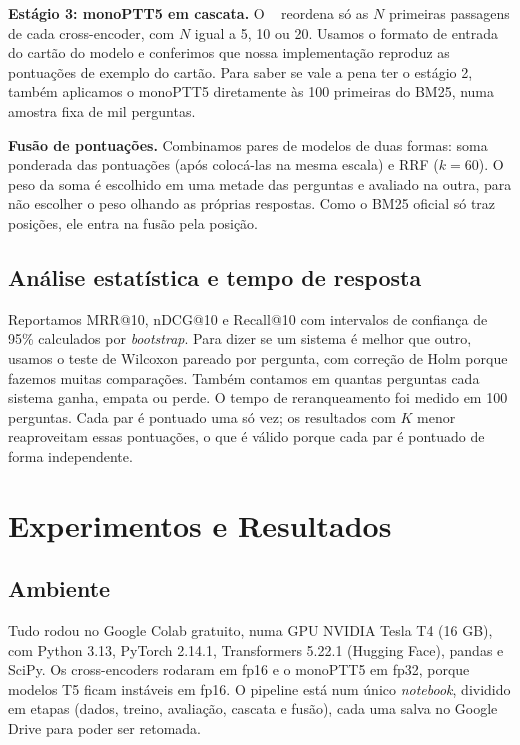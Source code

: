 \documentclass[12pt]{article}
\begin{document}
\textbf{Estágio 3: monoPTT5 em cascata.} O ~\cite{piau:2024}
reordena só as $N$ primeiras passagens de cada cross-encoder, com $N$ igual a 5, 10 ou 20.
Usamos o formato de entrada do cartão do modelo e conferimos que nossa implementação
reproduz as pontuações de exemplo do cartão. Para saber se vale a pena ter o estágio 2, também
aplicamos o monoPTT5 diretamente às 100 primeiras do BM25, numa amostra fixa de mil
perguntas.

\textbf{Fusão de pontuações.} Combinamos pares de modelos de duas formas: soma ponderada das
pontuações (após colocá-las na mesma escala) e RRF ($k=60$). O peso da soma é escolhido em uma
metade das perguntas e avaliado na outra, para não escolher o peso olhando as próprias
respostas. Como o BM25 oficial só traz posições, ele entra na fusão pela posição.

\subsection{Análise estatística e tempo de resposta}

Reportamos MRR@10, nDCG@10 e Recall@10 com intervalos de confiança de 95\% calculados por
\textit{bootstrap}. Para dizer se um sistema é melhor que outro, usamos o teste de Wilcoxon
pareado por pergunta, com correção de Holm porque fazemos muitas comparações. Também contamos
em quantas perguntas cada sistema ganha, empata ou perde. O tempo de reranqueamento foi
medido em 100 perguntas. Cada par é pontuado uma só vez; os resultados com $K$ menor
reaproveitam essas pontuações, o que é válido porque cada par é pontuado de forma
independente.

\section{Experimentos e Resultados}
\label{sec:resultados}

\subsection{Ambiente}

Tudo rodou no Google Colab gratuito, numa GPU NVIDIA Tesla T4 (16 GB), com Python 3.13,
PyTorch 2.14.1, Transformers 5.22.1 (Hugging Face), pandas e SciPy. Os cross-encoders rodaram
em fp16 e o monoPTT5 em fp32, porque modelos T5 ficam instáveis em fp16. O pipeline está num
único \textit{notebook}, dividido em etapas (dados, treino, avaliação, cascata e fusão), cada
uma salva no Google Drive para poder ser retomada.
\end{document}
